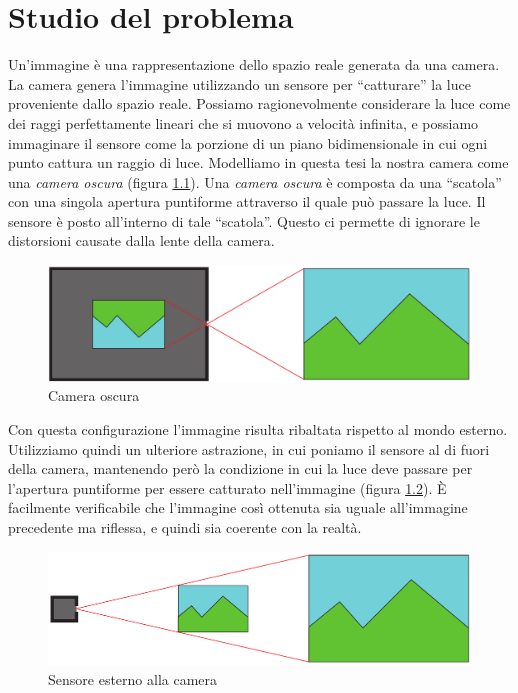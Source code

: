 \chapter{Studio del problema}
\label{sec:teoria}

Un'immagine è una rappresentazione dello spazio reale generata da una camera.
La camera genera l'immagine utilizzando un sensore per ``catturare'' la luce proveniente dallo spazio reale. 
Possiamo ragionevolmente considerare la luce come dei raggi perfettamente lineari che si muovono a velocità infinita, e possiamo immaginare il sensore come la porzione di un piano bidimensionale in cui ogni punto cattura un raggio di luce.
Modelliamo in questa tesi la nostra camera come una \emph{camera oscura} (figura \ref{fig:camera oscura}).
Una \emph{camera oscura} è composta da una ``scatola'' con una singola apertura puntiforme attraverso il quale può passare la luce.
Il sensore è posto all'interno di tale ``scatola''.
Questo ci permette di ignorare le distorsioni causate dalla lente della camera.
\begin{figure}
    \caption{Camera oscura}
    \label{fig:camera oscura}
    \centering
    \includegraphics[width=\textwidth]{images/camera oscura.pdf}
\end{figure}

Con questa configurazione l'immagine risulta ribaltata rispetto al mondo esterno.
Utilizziamo quindi un ulteriore astrazione, in cui poniamo il sensore al di fuori della camera, mantenendo però la condizione in cui la luce deve passare per l'apertura puntiforme per essere catturato nell'immagine (figura \ref{fig:camera model}).
È facilmente verificabile che l'immagine così ottenuta sia uguale all'immagine precedente ma riflessa, e quindi sia coerente con la realtà.
\begin{figure}
    \caption{Sensore esterno alla camera}
    \label{fig:camera model}
    \centering
    \includegraphics[width=\textwidth]{images/camera astratta.pdf}
\end{figure}

